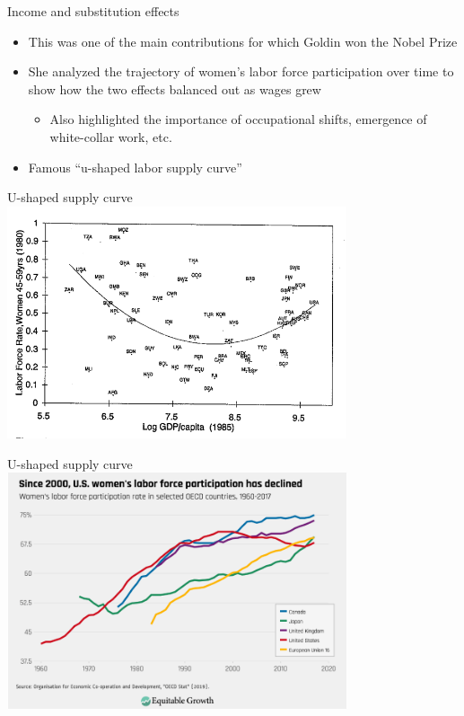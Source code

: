 \documentclass[aspectratio=169]{beamer}
\begin{document}
\begin{frame}{Income and substitution effects}
    \begin{itemize}
        \item This was one of the main contributions for which Goldin won the Nobel Prize
        \item She analyzed the trajectory of women's labor force participation over time to show how the two effects balanced out as wages grew
        \begin{itemize}
            \item Also highlighted the importance of occupational shifts, emergence of white-collar work, etc.
        \end{itemize}
        \item Famous ``u-shaped labor supply curve''
    \end{itemize}
\end{frame}

\begin{frame}{U-shaped supply curve}
    \centering
    \includegraphics[width = 0.75\textwidth,keepaspectratio]{./figs/ushape.png}
\end{frame}

\begin{frame}{U-shaped supply curve}
    \centering
    \includegraphics[width = 0.75\textwidth,keepaspectratio]{./figs/since2000.png}
\end{frame}
\end{document}
